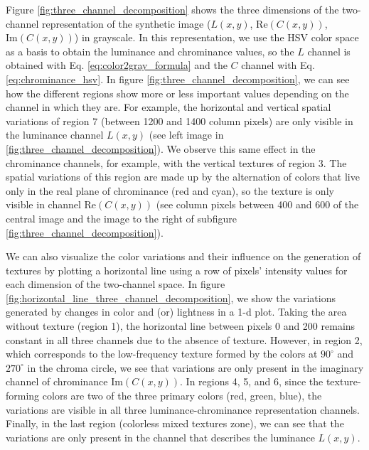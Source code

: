 \documentclass[journal]{IEEEtran}
\newcommand{\RE}{\mathrm{Re}}
\newcommand{\IM}{\mathrm{Im}}
\begin{document}
Figure \ref{fig:three_channel_decomposition} shows the three dimensions of the two-channel representation of the synthetic image ($L(x,y)$, $\RE(C(x,y))$, $\IM(C(x,y))$) in grayscale. In this representation, we use the HSV color space as a basis to obtain the luminance and chrominance values, so the $L$ channel is obtained with Eq. \eqref{eq:color2gray_formula} and the $C$ channel with Eq. \eqref{eq:chrominance_hsv}. In figure \ref{fig:three_channel_decomposition}, we can see how the different regions show more or less important values depending on the channel in which they are. For example, the horizontal and vertical spatial variations of region 7 (between 1200 and 1400 column pixels) are only visible in the luminance channel $L(x,y)$ (see left image in \ref{fig:three_channel_decomposition}). We observe this same effect in the chrominance channels, for example, with the vertical textures of region 3. The spatial variations of this region are made up by the alternation of colors that live only in the real plane of chrominance (red and cyan), so the texture is only visible in channel $\RE(C(x,y))$ (see column pixels between 400 and 600 of the central image and the image to the right of subfigure \ref{fig:three_channel_decomposition}). 

We can also visualize the color variations and their influence on the generation of textures by plotting a horizontal line using a row of pixels' intensity values for each dimension of the two-channel space. In figure \ref{fig:horizontal_line_three_channel_decomposition}, we show the variations generated by changes in color and (or) lightness in a 1-d plot. Taking the area without texture (region 1), the horizontal line between pixels 0 and 200 remains constant in all three channels due to the absence of texture. However, in region 2, which corresponds to the low-frequency texture formed by the colors at $90^\circ$ and $270^\circ$ in the chroma circle, we see that variations are only present in the imaginary channel of chrominance $\IM(C(x,y))$. In regions 4, 5, and 6, since the texture-forming colors are two of the three primary colors (red, green, blue), the variations are visible in all three luminance-chrominance representation channels. Finally, in the last region (colorless mixed textures zone), we can see that the variations are only present in the channel that describes the luminance $L(x,y)$.
\end{document}
